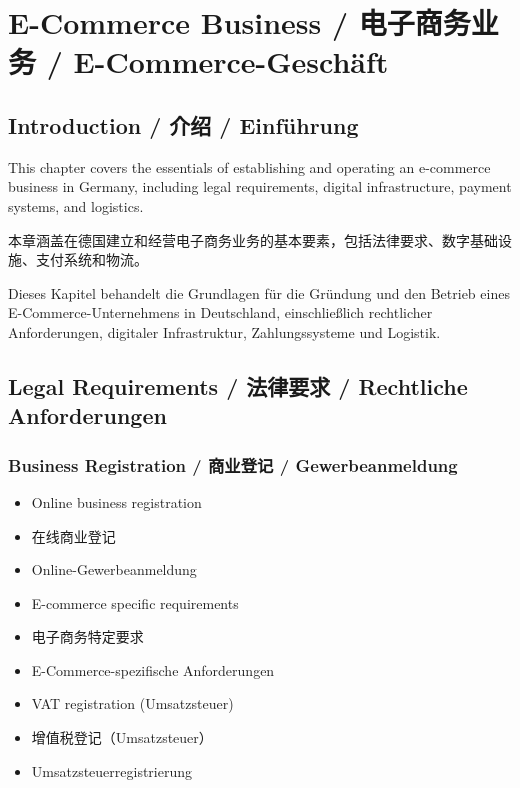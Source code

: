 \chapter{E-Commerce Business / 电子商务业务 / E-Commerce-Geschäft}

\section{Introduction / 介绍 / Einführung}

This chapter covers the essentials of establishing and operating an e-commerce business in Germany, including legal requirements, digital infrastructure, payment systems, and logistics.

本章涵盖在德国建立和经营电子商务业务的基本要素，包括法律要求、数字基础设施、支付系统和物流。

Dieses Kapitel behandelt die Grundlagen für die Gründung und den Betrieb eines E-Commerce-Unternehmens in Deutschland, einschließlich rechtlicher Anforderungen, digitaler Infrastruktur, Zahlungssysteme und Logistik.

\section{Legal Requirements / 法律要求 / Rechtliche Anforderungen}

\subsection{Business Registration / 商业登记 / Gewerbeanmeldung}
\begin{itemize}
    \item Online business registration
    \item 在线商业登记
    \item Online-Gewerbeanmeldung
    \item E-commerce specific requirements
    \item 电子商务特定要求
    \item E-Commerce-spezifische Anforderungen
    \item VAT registration (Umsatzsteuer)
    \item 增值税登记（Umsatzsteuer）
    \item Umsatzsteuerregistrierung
\end{itemize}

